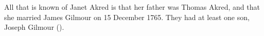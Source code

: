 
All that is known of Janet Akred is that her father was Thomas Akred, and that she married James Gilmour on 15 December 1765. They had at least one son, Joseph Gilmour ().
